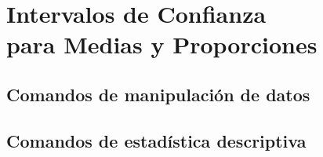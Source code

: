 
\chapter[Intervalos de Confianza para Medias y Proporciones]{Intervalos de Confianza\\ para Medias y Proporciones}

\section{Comandos de manipulación de datos}

\section{Comandos de estadística descriptiva}